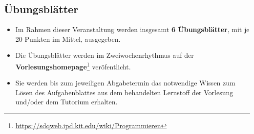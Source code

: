 \subsection*{Übungsblätter}
\begin{itemize}
		\item Im Rahmen dieser Veranstaltung werden insgesamt \textbf{6 Übungsblätter}, mit je 20 Punkten im Mittel, ausgegeben.
	\item Die Übungsblätter werden im Zweiwochenrhythmus auf der
	\textbf{Vorlesungshomepage}\footnote{\url{https://sdqweb.ipd.kit.edu/wiki/Programmieren}} veröfentlicht.
	\item Sie werden bis zum jeweiligen Abgabetermin das notwendige Wissen zum Lösen des Aufgabenblattes aus dem behandelten Lernstoff der Vorlesung und/oder dem Tutorium erhalten.
\end{itemize}
	
